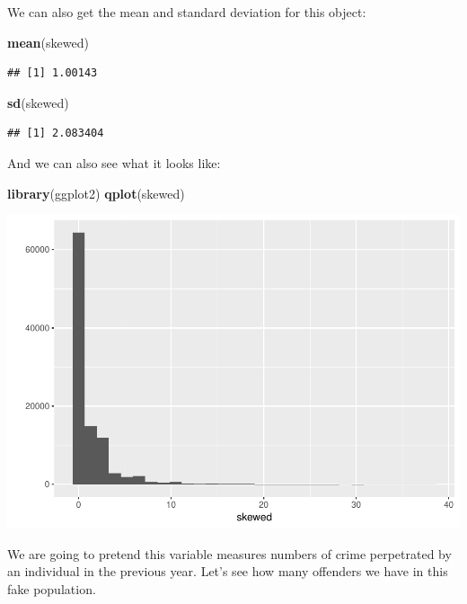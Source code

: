 \documentclass[]{book}
\newenvironment{Shaded}{\begin{snugshade}}{\end{snugshade}}
\newcommand{\KeywordTok}[1]{\textcolor[rgb]{0.13,0.29,0.53}{\textbf{#1}}}
\newcommand{\NormalTok}[1]{#1}
\theoremstyle{definition}
\theoremstyle{definition}
\theoremstyle{definition}
\theoremstyle{remark}
\begin{document}
We can also get the mean and standard deviation for this object:

\begin{Shaded}
\begin{Highlighting}[]
\KeywordTok{mean}\NormalTok{(skewed)}
\end{Highlighting}
\end{Shaded}

\begin{verbatim}
## [1] 1.00143
\end{verbatim}

\begin{Shaded}
\begin{Highlighting}[]
\KeywordTok{sd}\NormalTok{(skewed)}
\end{Highlighting}
\end{Shaded}

\begin{verbatim}
## [1] 2.083404
\end{verbatim}

And we can also see what it looks like:

\begin{Shaded}
\begin{Highlighting}[]
\KeywordTok{library}\NormalTok{(ggplot2)}
\KeywordTok{qplot}\NormalTok{(skewed)}
\end{Highlighting}
\end{Shaded}

\includegraphics{05-inference_files/figure-latex/unnamed-chunk-4-1.pdf}

We are going to pretend this variable measures numbers of crime
perpetrated by an individual in the previous year. Let's see how many
offenders we have in this fake population.
\end{document}
